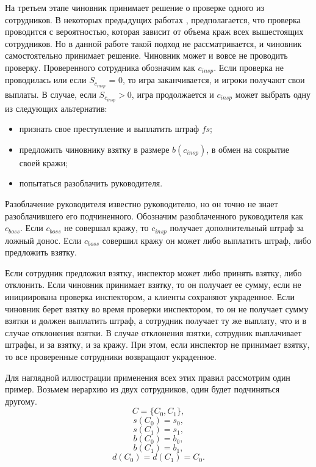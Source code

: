\par
На третьем этапе чиновник принимает решение о проверке одного из сотрудников. В некоторых предыдущих работах \cite{Orlov}, предполагается, что проверка проводится с вероятностью, которая зависит от объема краж всех вышестоящих сотрудников. Но в данной работе такой подход не рассматривается, и чиновник самостоятельно принимает решение. Чиновник может и вовсе не проводить проверку. Проверенного сотрудника обозначим как $c_{insp}$. Если проверка не проводилась или если $S_{c_{insp}}$ = 0, то игра заканчивается, и игроки получают свои выплаты.
В случае, если $S_{c_{insp}} > 0$, игра продолжается и $c_{insp}$ может выбрать одну из следующих альтернатив:
\begin{itemize}
	\item признать свое преступление и выплатить штраф $fs$;
	\item предложить чиновнику взятку в размере $b(c_{insp})$, в обмен на сокрытие своей кражи;
	\item попытаться разоблачить руководителя. 
\end{itemize}
Разоблачение руководителя известно руководителю, но он точно не знает разоблачившего его подчиненного. Обозначим разоблаченного руководителя как $c_{boss}$. Если $c_{boss}$ не совершал кражу, то $c_{insp}$ получает дополнительный штраф за ложный донос. Если $c_{boss}$ совершил кражу он может либо выплатить штраф, либо предложить взятку.
\par 
Если сотрудник предложил взятку, инспектор может либо принять взятку, либо отклонить. Если чиновник принимает взятку, то он получает ее сумму, если не инициирована проверка инспектором, а клиенты сохраняют украденное. Если чиновник берет взятку во время проверки инспектором, то он не получает сумму взятки и должен выплатить штраф, а сотрудник получает ту же выплату, что и в случае отклонения взятки. В случае отклонения взятки, сотрудник выплачивает штрафы, и за взятку, и за кражу. При этом, если инспектор не принимает взятку, то все проверенные сотрудники возвращают украденное.
\par
Для наглядной иллюстрации применения всех этих правил рассмотрим один пример.
Возьмем иерархию из двух сотрудников, один будет подчиняться другому.
	$$C = \{C_0, C_1\},$$
	$$s(C_0) = s_0,$$
	$$s(C_1) = s_1,$$
	\begin{equation}\label{eq2.9} b(C_0) = b_0,\end{equation}
	$$b(C_1) = b_1,$$
	$$d(C_0) = d(C_1) = C_0.$$

